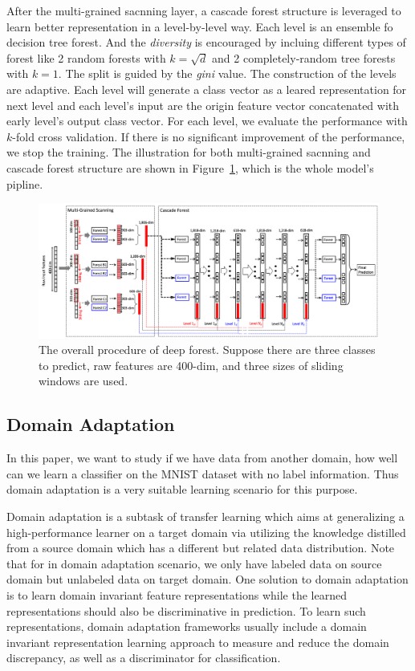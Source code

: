 \documentclass{article} %
\begin{document}
After the multi-grained sacnning layer, a cascade forest structure is leveraged to learn better representation in a level-by-level way. Each level is an ensemble fo decision tree forest. And the \textit{diversity} is encouraged by incluing different types of forest like 2 random forests with $k=\sqrt{d}$ and 2 completely-random tree forests with $k=1$. The split is guided by the \textit{gini} value. The construction of the levels are adaptive. Each level will generate a class vector as a leared representation for next level and each level's input are the origin feature vector concatenated with early level's output class vector. For each level, we evaluate the performance with $k$-fold cross validation. If there is no significant improvement of the performance, we stop the training. The illustration for both multi-grained sacnning and cascade forest structure are shown in Figure~\ref{fig:deep-forest}, which is the whole model's pipline. 



\begin{figure}[h]
	\centering
	\includegraphics[width=1\linewidth]{./figs/deep-forest}
	\caption{The overall procedure of deep forest. Suppose there are three classes to predict, raw features are 400-dim, and three sizes of sliding windows are used.}
	\label{fig:deep-forest}
\end{figure}

\subsection{Domain Adaptation}
In this paper, we want to study if we have data from another domain, how well can we learn a classifier on the MNIST dataset with no label information. Thus domain adaptation is a very suitable learning scenario for this purpose.

Domain adaptation is a subtask of transfer learning which aims at generalizing a high-performance learner on a target domain via utilizing the knowledge distilled from a source domain which has a different but related data distribution. Note that for in domain adaptation scenario, we only have labeled data on source domain but unlabeled data on target domain. One solution to domain adaptation is to learn domain invariant feature representations while the learned representations should also be discriminative in prediction. To learn such representations, domain adaptation frameworks usually include a domain invariant representation learning approach to measure and reduce the domain discrepancy, as well as a discriminator for classification. 
\end{document}
